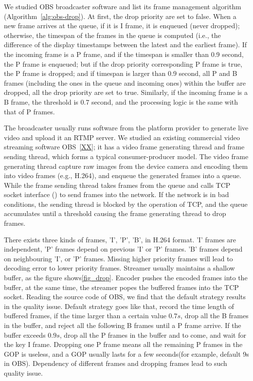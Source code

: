 We studied OBS broadcaster software and list its frame management algorithm (Algorithm~\ref{alg:obs-drop}). At first, the drop priority are set to false. When a new frame arrives at the queue, if it is I frame, it is enqueued (never dropped); otherwise, the timespan of the frames in the queue is computed (i.e., the difference of the display timestamps between the latest and the earliest frame). If the incoming frame is a P frame, and if the timespan is smaller than 0.9 second, the P frame is enqueued; but if the drop priority corresponding P frame is true, the P frame is dropped; and if timespan is larger than 0.9 second, all P and B frames (including the ones in the queue and incoming ones) within the buffer are dropped, all the drop priority are set to true. Similarly, if the incoming frame is a B frame, the threshold is 0.7 second, and the processing logic is the same with that of P frames.

\iffalse

The broadcaster usually runs software from the platform provider to generate live video and upload it an RTMP server. We studied an existing commercial video streaming software OBS~\ref{XX}; it has a video frame generating thread and frame sending thread, which forms a typical consumer-producer model. The video frame generating thread capture raw images from the device camera and encoding them into video frames (e.g., H.264), and enqueue the generated frames into a queue. While the frame sending thread takes frames from the queue and calls TCP socket interface (\mywrite) to send frames into the network. If the network is in bad conditions, the sending thread is blocked by the \mywrite operation of TCP, and the queue accumulates until a threshold causing the frame generating thread to drop frames.


There exists three kinds of frames, 'I', 'P', 'B', in H.264 format. 'I' frames are independent, 'P' frames depend on previous 'I' or 'P' frames. 'B' frames depend on neighbouring 'I', or 'P' frames. Missing higher priority frames will lead to decoding error to lower priority frames.
Streamer usually maintains a shallow buffer, as the figure shows\ref{fig_drop}. Encoder pushes the encoded frames into the buffer, at the same time, the streamer popes the buffered frames into the TCP socket. Reading the source code of OBS, we find that the default strategy results in the quality issue. Default strategy goes like that, record the time length of buffered frames, if the time larger than a certain value $0.7s$, drop all the B frames in the buffer, and reject all the following B frames until a P frame arrive. If the buffer exceeds $0.9s$, drop all the P frames in the buffer and to come, and wait for the key I frame. Dropping one P frame means all the remaining P frames in the GOP is useless, and a GOP usually lasts for a few seconds(for example, default 9s in OBS). Dependency of different frames and dropping frames lead to such quality issue.

